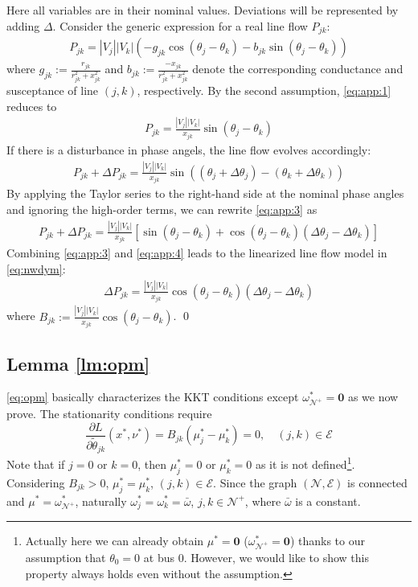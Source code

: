 \documentclass[journal,12pt,onecolumn,draftclsnofoot]{IEEEtran}
\begin{document}
Here all variables are in their nominal values. Deviations will be represented by adding $\Delta$.
Consider the generic expression for a real line flow $P_{jk}$:
\begin{eqnarray}\label{eq:app:1}
     P_{jk}= |V_j||V_k|\left(-g_{jk}\cos(\theta_j-\theta_k)-b_{jk}\sin(\theta_j-\theta_k)\right)
\end{eqnarray} 
where $g_{jk}:=\frac{r_{jk}}{r_{jk}^2+x_{jk}^2}$ and $b_{jk}:=\frac{-x_{jk}}{r_{jk}^2+x_{jk}^2}$ denote the corresponding conductance and susceptance of line $(j,k)$, respectively. By the second assumption, \eqref{eq:app:1} reduces to
\begin{eqnarray}\label{eq:app:2}
P_{jk}= \frac{|V_j||V_k|}{x_{jk}}\sin(\theta_j-\theta_k)
\end{eqnarray} 
If there is a disturbance in phase angels, the line flow evolves accordingly:
\begin{eqnarray}\label{eq:app:3}
P_{jk} + \Delta P_{jk}= \frac{|V_j||V_k|}{x_{jk}}\sin((\theta_j+\Delta \theta_j)-(\theta_k+\Delta \theta_k))
\end{eqnarray} 
By applying the Taylor series to the right-hand side at the nominal phase angles and ignoring the high-order terms, we can rewrite \eqref{eq:app:3} as 
 \begin{eqnarray}\label{eq:app:4}
  P_{jk} + \Delta P_{jk}= \frac{|V_j||V_k|}{x_{jk}}\left[\sin(\theta_j-\theta_k)+\cos(\theta_j-\theta_k)(\Delta \theta_j-\Delta \theta_k)\right]
  \end{eqnarray} 
Combining \eqref{eq:app:3} and \eqref{eq:app:4} leads to the linearized line flow model in \eqref{eq:nwdym}:
 \begin{eqnarray}\label{eq:app:5}
\Delta P_{jk}= \frac{|V_j||V_k|}{x_{jk}}\cos(\theta_j-\theta_k)(\Delta \theta_j-\Delta \theta_k)
\end{eqnarray} 
where $B_{jk}:=\frac{|V_j||V_k|}{x_{jk}}\cos(\theta_j-\theta_k)$.
\qed



\subsection{Lemma \ref{lm:opm}}

\eqref{eq:opm} basically characterizes the KKT conditions except $\omega_{\mathcal{N}^+}^*=\mathbf{0}$ as we now prove. The stationarity conditions require
\begin{equation}
    \frac{\partial L}{\partial \tilde \theta_{jk} }(x^*,\nu^*) = B_{jk} (\mu_j^*-\mu_k^*)= 0,\quad (j,k)\in\mathcal{E}
\end{equation}
Note that if $j=0$ or $k=0$, then $\mu_j^*=0$ or $\mu_k^*=0$ as it is not defined\footnote{Actually here we can already obtain $\mu^*=\mathbf{0}$ ($\omega^*_{\mathcal{N}^+}=\mathbf{0}$) thanks to our assumption that $\theta_0=0$ at bus 0. However, we would like to show this property always holds even without the assumption.}.
Considering $B_{jk} >0$, $\mu^*_j=\mu^*_k$, $(j,k)\in\mathcal{E}$. Since the graph $(\mathcal{N},\mathcal{E})$ is connected and $\mu^*=\omega^*_{\mathcal{N}^+}$, naturally $\omega^*_j=\omega^*_k=\bar \omega$, $j,k\in\mathcal{N}^+$, where $\bar{\omega}$ is a constant.
\end{document}
